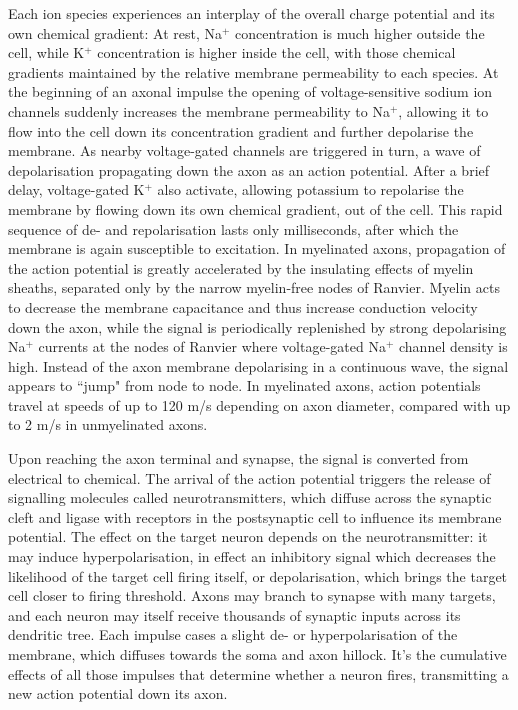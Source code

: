 Each ion species experiences an interplay of the overall charge potential and its own chemical gradient:
At rest, Na$^+$ concentration is much higher outside the cell, while K$^+$ concentration is higher inside the cell, with those chemical gradients maintained by the relative membrane permeability to each species.
At the beginning of an axonal impulse the opening of voltage-sensitive sodium ion channels suddenly increases the membrane permeability to Na$^+$, allowing it to flow into the cell down its concentration gradient and further depolarise the membrane.
As nearby voltage-gated channels are triggered in turn, a wave of depolarisation propagating down the axon as an action potential.
After a brief delay, voltage-gated K$^+$ also activate, allowing potassium to repolarise the membrane by flowing down its own chemical gradient, out of the cell.
This rapid sequence of de- and repolarisation lasts only milliseconds, after which the membrane is again susceptible to excitation.
In myelinated axons, propagation of the action potential is greatly accelerated by the insulating effects of myelin sheaths, separated only by the narrow myelin-free nodes of Ranvier.
Myelin acts to decrease the membrane capacitance and thus increase conduction velocity down the axon, while the signal is periodically replenished by strong depolarising Na$^+$ currents at the nodes of Ranvier where voltage-gated Na$^+$ channel density is high.
Instead of the axon membrane depolarising in a continuous wave, the signal appears to ``jump" from node to node.
In myelinated axons, action potentials travel at speeds of up to 120 m/s depending on axon diameter, compared with up to 2 m/s in unmyelinated axons.

Upon reaching the axon terminal and synapse, the signal is converted from electrical to chemical.
The arrival of the action potential triggers the release of signalling molecules called neurotransmitters, which diffuse across the synaptic cleft and ligase with receptors in the postsynaptic cell to influence its membrane potential.
The effect on the target neuron depends on the neurotransmitter: it may induce hyperpolarisation, in effect an inhibitory signal which decreases the likelihood of the target cell firing itself, or depolarisation, which brings the target cell closer to firing threshold.
Axons may branch to synapse with many targets, and each neuron may itself receive thousands of synaptic inputs across its dendritic tree.
Each impulse cases a slight de- or hyperpolarisation of the membrane, which diffuses towards the soma and axon hillock.
It's the cumulative effects of all those impulses that determine whether a neuron fires, transmitting a new action potential down its axon.

